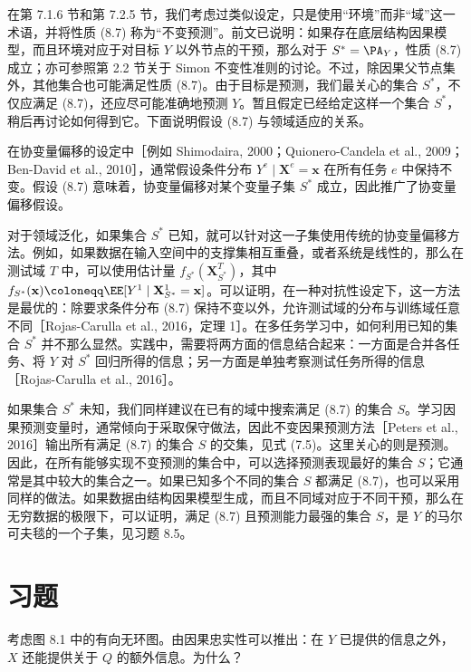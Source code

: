 在第 7.1.6 节和第 7.2.5 节，我们考虑过类似设定，只是使用“环境”而非“域”这一术语，并将性质 (8.7) 称为“不变预测”。前文已说明：如果存在底层结构因果模型，而且环境对应于对目标 $Y$ 以外节点的干预，那么对于 $S^*=\PA_Y$，性质 (8.7) 成立；亦可参照第 2.2 节关于 Simon 不变性准则的讨论。不过，除因果父节点集外，其他集合也可能满足性质 (8.7)。由于目标是预测，我们最关心的集合 $S^*$，不仅应满足 (8.7)，还应尽可能准确地预测 $Y$。暂且假定已经给定这样一个集合 $S^*$，稍后再讨论如何得到它。下面说明假设 (8.7) 与领域适应的关系。

在协变量偏移的设定中［例如 Shimodaira, 2000；Quionero-Candela et al., 2009；Ben-David et al., 2010］，通常假设条件分布 $Y^e\mid\mathbf X^e=\mathbf x$ 在所有任务 $e$ 中保持不变。假设 (8.7) 意味着，协变量偏移对某个变量子集 $S^*$ 成立，因此推广了协变量偏移假设。

对于领域泛化，如果集合 $S^*$ 已知，就可以针对这一子集使用传统的协变量偏移方法。例如，如果数据在输入空间中的支撑集相互重叠，或者系统是线性的，那么在测试域 $T$ 中，可以使用估计量 $f_{S^*}(\mathbf X^T_{S^*})$，其中 $f_{S^*}(\mathbf x)\coloneqq\EE[Y^1\mid\mathbf X^1_{S^*}=\mathbf x]$。可以证明，在一种对抗性设定下，这一方法是最优的：除要求条件分布 (8.7) 保持不变以外，允许测试域的分布与训练域任意不同［Rojas-Carulla et al., 2016，定理 1］。在多任务学习中，如何利用已知的集合 $S^*$ 并不那么显然。实践中，需要将两方面的信息结合起来：一方面是合并各任务、将 $Y$ 对 $S^*$ 回归所得的信息；另一方面是单独考察测试任务所得的信息［Rojas-Carulla et al., 2016］。

如果集合 $S^*$ 未知，我们同样建议在已有的域中搜索满足 (8.7) 的集合 $S$。学习因果预测变量时，通常倾向于采取保守做法，因此不变因果预测方法［Peters et al., 2016］输出所有满足 (8.7) 的集合 $S$ 的交集，见式 (7.5)。这里关心的则是预测。因此，在所有能够实现不变预测的集合中，可以选择预测表现最好的集合 $S$；它通常是其中较大的集合之一。如果已知多个不同的集合 $S$ 都满足 (8.7)，也可以采用同样的做法。如果数据由结构因果模型生成，而且不同域对应于不同干预，那么在无穷数据的极限下，可以证明，满足 (8.7) 且预测能力最强的集合 $S$，是 $Y$ 的马尔可夫毯的一个子集，见习题 8.5。
\FloatBarrier

\section{习题}
\label{sec:ch08-problems}

\setcounter{problem}{2}
\begin{problem}[半同胞回归]
考虑图 8.1 中的有向无环图。由因果忠实性可以推出：在 $Y$ 已提供的信息之外，$X$ 还能提供关于 $Q$ 的额外信息。为什么？
\end{problem}

